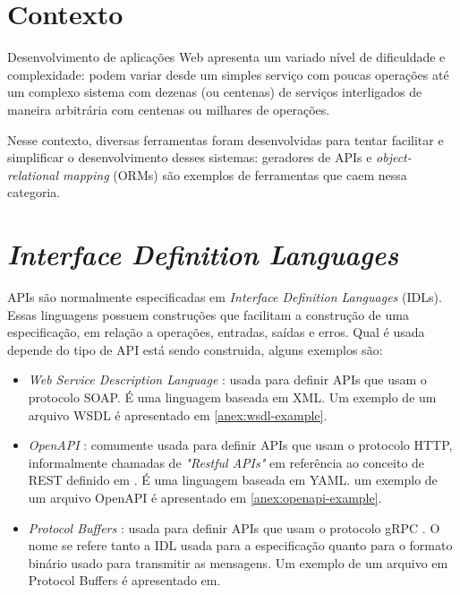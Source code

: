 \section{Contexto}

Desenvolvimento de aplicações Web apresenta um variado nível de dificuldade e
complexidade: podem variar desde um simples serviço com poucas operações até
um complexo sistema com dezenas (ou centenas) de serviços interligados de maneira
arbitrária com centenas ou milhares de operações.

Nesse contexto, diversas ferramentas foram desenvolvidas para tentar facilitar
e simplificar o desenvolvimento desses sistemas: geradores de APIs e \textit{object-relational
mapping} (ORMs) são exemplos de ferramentas que caem nessa categoria.

\section{\textit{Interface Definition Languages}}

APIs são normalmente especificadas em \textit{Interface Definition Languages}
(IDLs). Essas linguagens possuem construções que facilitam a construção de uma
especificação, em relação a operações, entradas, saídas e erros. Qual é usada
depende do tipo de API está sendo construida, alguns exemplos são:

\begin{itemize}
\item
  \textit{Web Service Description Language} \cite{wsdl:spec}: usada para
    definir APIs que usam o protocolo SOAP. É uma linguagem baseada em XML.
    Um exemplo de um arquivo WSDL é apresentado em \cref{anex:wsdl-example}.
\item
  \textit{OpenAPI} \cite{openapi:spec}: comumente usada para definir APIs que usam
    o protocolo HTTP, informalmente chamadas de \textit{"Restful APIs"} em referência
    ao conceito de REST definido em \cite{10.5555/932295}. É uma linguagem baseada
    em YAML. um exemplo de um arquivo OpenAPI é apresentado em \cref{anex:openapi-example}.
\item
  \textit{Protocol Buffers} \cite{googl:protobuf}: usada para definir APIs que usam
    o protocolo gRPC \cite{googl:grpc}. O nome se refere tanto a IDL usada para a
    especificação quanto para o formato binário usado para transmitir as mensagens.
    Um exemplo de um arquivo em Protocol Buffers é apresentado em.
\end{itemize}

